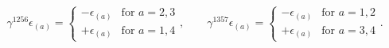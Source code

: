 \begin{equation}
   \gamma^{1256}\epsilon_{(a)} = \begin{cases}
      - \epsilon_{(a)} & \text{for $a=2,3$} \\
      + \epsilon_{(a)} & \text{for $a=1,4$} 
      \end{cases} ,
   \qquad
   \gamma^{1357}\epsilon_{(a)} = \begin{cases}
      - \epsilon_{(a)} & \text{for $a=1,2$} \\
      + \epsilon_{(a)} & \text{for $a=3,4$} 
      \end{cases} .
\end{equation}

